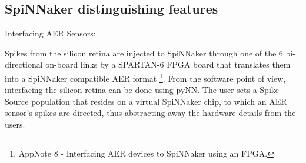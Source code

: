 \subsection{SpiNNaker distinguishing features}
Interfacing AER Sensors: 

Spikes from the silicon retina are injected to SpiNNaker through one of the 6 bi-directional on-board links by a SPARTAN-6 FPGA board that translates them into a SpiNNaker compatible AER format \footnote{AppNote 8 - Interfacing AER devices to SpiNNaker using an FPGA.}. 
From the software point of view, interfacing the silicon retina can be done using pyNN. 
The user sets a Spike Source population that resides on a virtual SpiNNaker chip, to which an AER sensor's spikes are directed, thus abstracting away the hardware details from the users\cite{galluppi2012real}.
